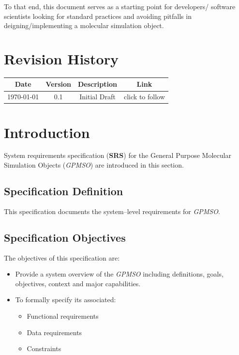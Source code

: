 \documentclass[12pt]{article}
\begin{document}
To that end, this document serves as a starting point for developers/ software scientists looking for standard practices and avoiding pitfalls in deigning/implementing a molecular simulation object.

{\centering \section*{Revision History}}
\begin{table}[ht]
    \centering
    \begin{tabular}{|c|c|c|c|}
    \hline
    \textbf{Date} &  \textbf{Version} & \textbf{Description}  & \textbf{Link} \\
    \hline
    \today & 0.1 & Initial Draft & click to follow \\
    \hline
    \end{tabular}
\end{table}

\pagebreak
\tableofcontents
\thispagestyle{empty}
\pagebreak


\section{Introduction}
System requirements specification (\textbf{SRS}) for the General Purpose Molecular Simulation Objects (\textit{GPMSO}) are introduced in this section.

\subsection{Specification Definition}
This specification documents the system--level requirements for \textit{GPMSO}.

\subsection{Specification Objectives}
The objectives of this specification are:

\begin{itemize}
    \item Provide a system overview of the \textit{GPMSO} including definitions, goals, objectives, context and major capabilities.
    \item To formally specify its associated:
      \begin{itemize}
          \item Functional requirements
          \item Data requirements
          \item Constraints
      \end{itemize}
\end{itemize}
\end{document}
